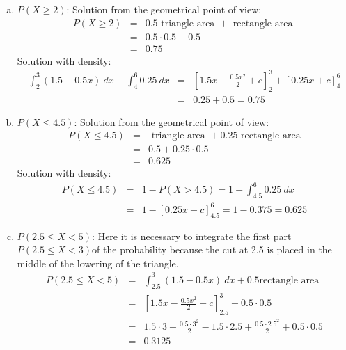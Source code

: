 \documentclass[12pt,thmsa]{article}\usepackage[]{graphicx}\usepackage[]{color}
\begin{document}
\begin{enumerate}
  \begin{enumerate}[(a)]
  \item $P(X \ge 2)$: Solution from the geometrical point of view:
    \begin{eqnarray*}
      P(X \ge 2) &=& 0.5 \text{ triangle area } + \text{ rectangle area } \\
      &=& 0.5 \cdot 0.5 + 0.5 \\ &=& {0.75}
    \end{eqnarray*}
Solution with density:
    \begin{eqnarray*}
      \int_2^3 (1.5-0.5x) \ dx + \int_4^6 0.25 \ dx &=& \left[ 1.5x - \frac{0.5x^2}{2} + c \right]^{3}_{2} + \left[ 0.25x  + c \right]^{6}_{4} \\
    &=&  0.25 + 0.5 = 0.75
    \end{eqnarray*}
    \item $P(X \le 4.5)$: Solution from the geometrical point of view:
    \begin{eqnarray*}
      P(X \le 4.5) &=& \text{ triangle area } + 0.25 \text{ rectangle area} \\
      &=& 0.5 + 0.25 \cdot 0.5 \\ &=& {0.625}
    \end{eqnarray*}
    Solution with density:
    \begin{eqnarray*}
    P(X \le 4.5) & = &  1-P(X>4.5) = 1- \int_{4.5}^6  0.25 \ dx \\
    & = & 1- \left[ 0.25x + c \right]^{6}_{4.5} = 1- 0.375 = 0.625
    \end{eqnarray*}

    \item $P(2.5 \le X < 5)$: Here it is necessary to integrate the first part $P(2.5 \le X < 3)$of the probability because the cut at 2.5 is placed in the middle of the lowering of the triangle.
    \begin{eqnarray*}
      P(2.5 \le X < 5) &=& \int_{2.5}^3 (1.5-0.5x) \ dx  + 0.5 \text{
        rectangle area} \\
      &=& \left[ 1.5x - \frac{0.5x^2}{2} + c \right]_{2.5}^3  +
      0.5 \cdot 0.5
      \\
      &=& 1.5 \cdot 3 - \frac{0.5 \cdot 3^2}{2} - 1.5 \cdot 2.5 +
      \frac{0.5 \cdot 2.5^2}{2} + 0.5 \cdot 0.5 \\
      &=& {0.3125}
    \end{eqnarray*}
  \end{enumerate}

\end{enumerate}
\end{document}
